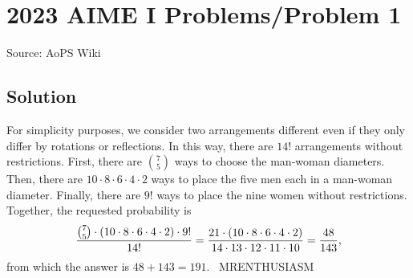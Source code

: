 \documentclass[12pt]{article}
\begin{document}
\section*{{2023 AIME I Problems/Problem 1}}
Source: AoPS Wiki

\subsection*{Solution}
For simplicity purposes, we consider two arrangements different even if they only differ by rotations or reflections. In this way, there are $14!$ arrangements without restrictions. First, there are $\binom{7}{5}$ ways to choose the man-woman diameters. Then, there are $10\cdot8\cdot6\cdot4\cdot2$ ways to place the five men each in a man-woman diameter. Finally, there are $9!$ ways to place the nine women without restrictions. Together, the requested probability is \[\frac{\tbinom{7}{5}\cdot(10\cdot8\cdot6\cdot4\cdot2)\cdot9!}{14!} = \frac{21\cdot(10\cdot8\cdot6\cdot4\cdot2)}{14\cdot13\cdot12\cdot11\cdot10} = \frac{48}{143},\] from which the answer is $48+143 = \boxed{191}.$ ~MRENTHUSIASM
\end{document}
